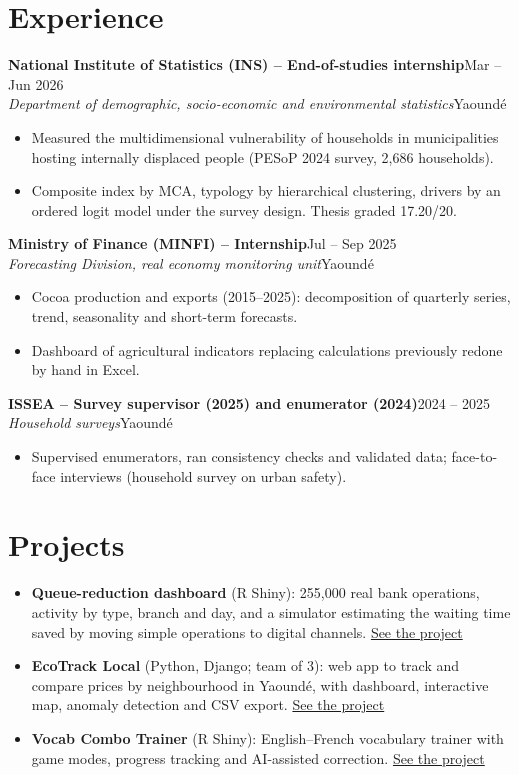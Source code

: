 \documentclass[10pt,a4paper]{article}
\newcommand{\entry}[4]{\textbf{#1}\hfill{\small\color{muted}#2}\\{\itshape #3}\hfill{\small\color{muted}#4}\par}
\newcommand{\lnk}[2]{\href{#1}{\color{olive}#2}}
\begin{document}
\section{Experience}
\entry{National Institute of Statistics (INS) -- End-of-studies internship}{Mar -- Jun 2026}{Department of demographic, socio-economic and environmental statistics}{Yaound\'e}
\begin{itemize}
\item Measured the multidimensional vulnerability of households in municipalities hosting internally displaced people (PESoP 2024 survey, 2,686 households).
\item Composite index by MCA, typology by hierarchical clustering, drivers by an ordered logit model under the survey design. Thesis graded 17.20/20.
\end{itemize}
\vspace{2pt}
\entry{Ministry of Finance (MINFI) -- Internship}{Jul -- Sep 2025}{Forecasting Division, real economy monitoring unit}{Yaound\'e}
\begin{itemize}
\item Cocoa production and exports (2015--2025): decomposition of quarterly series, trend, seasonality and short-term forecasts.
\item Dashboard of agricultural indicators replacing calculations previously redone by hand in Excel.
\end{itemize}
\vspace{2pt}
\entry{ISSEA -- Survey supervisor (2025) and enumerator (2024)}{2024 -- 2025}{Household surveys}{Yaound\'e}
\begin{itemize}
\item Supervised enumerators, ran consistency checks and validated data; face-to-face interviews (household survey on urban safety).
\end{itemize}

\section{Projects}
\begin{itemize}
\item \textbf{Queue-reduction dashboard} (R Shiny): 255,000 real bank operations, activity by type, branch and day, and a simulator estimating the waiting time saved by moving simple operations to digital channels. \lnk{https://joris-nitiema.github.io/projects/queue-dashboard/}{See the project}
\item \textbf{EcoTrack Local} (Python, Django; team of 3): web app to track and compare prices by neighbourhood in Yaound\'e, with dashboard, interactive map, anomaly detection and CSV export. \lnk{https://joris-nitiema.github.io/projects/ecotrack/}{See the project}
\item \textbf{Vocab Combo Trainer} (R Shiny): English--French vocabulary trainer with game modes, progress tracking and AI-assisted correction. \lnk{https://joris-nitiema.github.io/projects/vocab-trainer/}{See the project}
\end{itemize}
\end{document}
